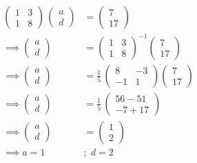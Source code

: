 \documentclass[journal,12pt,twocolumn]{IEEEtran}
\theoremstyle{remark}
\begin{document}
\begin{align}
 \begin{pmatrix}
1&3\\
1&8
\end{pmatrix}  
\,
\begin{pmatrix}
    a\\
    d
\end{pmatrix}
&=
\begin{pmatrix}
    7\\
    17
\end{pmatrix}\\
\implies\begin{pmatrix}
    a\\
    d
\end{pmatrix}
&=
 \begin{pmatrix}
1&3\\
1&8
\end{pmatrix}^{-1}  
\begin{pmatrix}
    7\\
    17
\end{pmatrix}\\
\implies\begin{pmatrix}
    a\\
    d
\end{pmatrix}
&=
\frac{1}{5}\,
\begin{pmatrix}
    8&-3\\
    -1&1
\end{pmatrix}  
\begin{pmatrix}
    7\\
    17
\end{pmatrix}\\  
\implies\begin{pmatrix}
    a\\
    d
\end{pmatrix}
&=\frac{1}{5}\,
\begin{pmatrix}
    56-51\\
    -7+17
\end{pmatrix}\\  
\implies\begin{pmatrix}
    a\\
    d
\end{pmatrix}
&=
\begin{pmatrix}
    1\\
    2
\end{pmatrix}\\
\implies a=1&;\;d=2  
\end{align}
\end{document}
